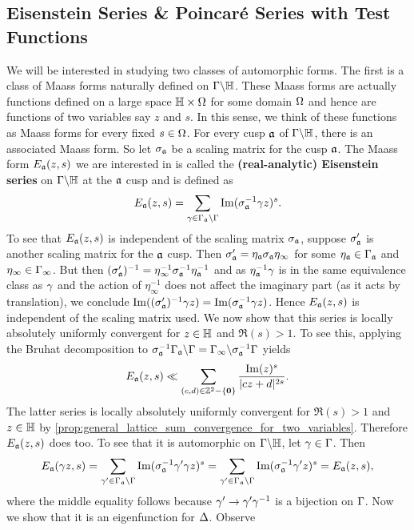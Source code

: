     \subsection*{Eisenstein Series \& Poincar\'e Series with Test Functions}
      We will be interested in studying two classes of automorphic forms. The first is a class of Maass forms naturally defined on $\Gamma\backslash\mathbb{H}$. These Maass forms are actually functions defined on a large space $\mathbb{H} \times \Omega$ for some domain $\Omega$ and hence are functions of two variables say $z$ and $s$. In this sense, we think of these functions as Maass forms for every fixed $s \in \Omega$. For every cusp $\mathfrak{a}$ of $\Gamma\backslash\mathbb{H}$, there is an associated Maass form. So let $\sigma_{\mathfrak{a}}$ be a scaling matrix for the cusp $\mathfrak{a}$. The Maass form $E_{\mathfrak{a}}(z,s)$ we are interested in is called the \textbf{(real-analytic) Eisenstein series} on $\Gamma\backslash\mathbb{H}$ at the $\mathfrak{a}$ cusp and is defined as
      \[
        E_{\mathfrak{a}}(z,s) = \sum_{\gamma \in \Gamma_{\mathfrak{a}}\backslash\Gamma}\mathrm{Im}(\sigma_{\mathfrak{a}}^{-1}\gamma z)^{s}.
      \]
      To see that $E_{\mathfrak{a}}(z,s)$ is independent of the scaling matrix $\sigma_{\mathfrak{a}}$, suppose $\sigma_{\mathfrak{a}}'$ is another scaling matrix for the $\mathfrak{a}$ cusp. Then $\sigma_{\mathfrak{a}}' = \eta_{\mathfrak{a}}\sigma_{\mathfrak{a}}\eta_{\infty}$ for some $\eta_{\mathfrak{a}} \in \Gamma_{\mathfrak{a}}$ and $\eta_{\infty} \in \Gamma_{\infty}$. But then $(\sigma_{\mathfrak{a}}')^{-1} = \eta_{\infty}^{-1}\sigma_{\mathfrak{a}}^{-1}\eta_{\mathfrak{a}}^{-1}$ and as $\eta_{\mathfrak{a}}^{-1}\gamma$ is in the same equivalence class as $\gamma$ and the action of $\eta_{\infty}^{-1}$ does not affect the imaginary part (as it acts by translation), we conclude $\mathrm{Im}((\sigma_{\mathfrak{a}}')^{-1}\gamma z) = \mathrm{Im}(\sigma_{\mathfrak{a}}^{-1}\gamma z)$. Hence $E_{\mathfrak{a}}(z,s)$ is independent of the scaling matrix used. We now show that this series is locally absolutely uniformly convergent for $z \in \mathbb{H}$ and $\Re(s) > 1$. To see this, applying the Bruhat decomposition to $\sigma_{\mathfrak{a}}^{-1}\Gamma_{\mathfrak{a}}\backslash\Gamma = \Gamma_{\infty}\backslash\sigma_{\mathfrak{a}}^{-1}\Gamma$ yields
      \[
        E_{\mathfrak{a}}(z,s) \ll \sum_{(c,d) \in \mathbb{Z}^{2}-\{\mathbf{0}\}}\frac{\mathrm{Im}(z)^{s}}{|cz+d|^{2s}}.
      \]
      The latter series is locally absolutely uniformly convergent for $\Re(s) > 1$ and $z \in \mathbb{H}$ by \cref{prop:general_lattice_sum_convergence_for_two_variables}. Therefore $E_{\mathfrak{a}}(z,s)$ does too. To see that it is automorphic on $\Gamma\backslash\mathbb{H}$, let $\gamma \in \Gamma$. Then
      \[
        E_{\mathfrak{a}}(\gamma z,s) = \sum_{\gamma' \in \Gamma_{\mathfrak{a}}\backslash\Gamma}\mathrm{Im}(\sigma_{\mathfrak{a}}^{-1}\gamma'\gamma z)^{s} = \sum_{\gamma' \in \Gamma_{\mathfrak{a}}\backslash\Gamma}\mathrm{Im}(\sigma_{\mathfrak{a}}^{-1}\gamma'z)^{s} = E_{\mathfrak{a}}(z,s),
      \]
      where the middle equality follows because $\gamma' \to \gamma'\gamma^{-1}$ is a bijection on $\Gamma$. Now we show that it is an eigenfunction for $\Delta$. Observe

